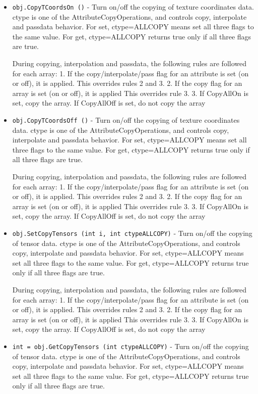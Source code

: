 \begin{itemize}
\item  \verb|obj.CopyTCoordsOn ()| -  Turn on/off the copying of texture coordinates data.
 ctype is one of the AttributeCopyOperations, and controls copy, 
 interpolate and passdata behavior.
 For set, ctype=ALLCOPY means set all three flags to the same value.
 For get, ctype=ALLCOPY returns true only if all three flags are true.

 During copying, interpolation and passdata, the following rules are 
 followed for each array:
 1. If the copy/interpolate/pass flag for an attribute is set (on or off), it is applied.
    This overrides rules 2 and 3.
 2. If the copy flag for an array is set (on or off), it is applied
    This overrides rule 3.
 3. If CopyAllOn is set, copy the array.
    If CopyAllOff is set, do not copy the array

\item  \verb|obj.CopyTCoordsOff ()| -  Turn on/off the copying of texture coordinates data.
 ctype is one of the AttributeCopyOperations, and controls copy, 
 interpolate and passdata behavior.
 For set, ctype=ALLCOPY means set all three flags to the same value.
 For get, ctype=ALLCOPY returns true only if all three flags are true.

 During copying, interpolation and passdata, the following rules are 
 followed for each array:
 1. If the copy/interpolate/pass flag for an attribute is set (on or off), it is applied.
    This overrides rules 2 and 3.
 2. If the copy flag for an array is set (on or off), it is applied
    This overrides rule 3.
 3. If CopyAllOn is set, copy the array.
    If CopyAllOff is set, do not copy the array

\item  \verb|obj.SetCopyTensors (int i, int ctypeALLCOPY)| -  Turn on/off the copying of tensor data.
 ctype is one of the AttributeCopyOperations, and controls copy, 
 interpolate and passdata behavior.
 For set, ctype=ALLCOPY means set all three flags to the same value.
 For get, ctype=ALLCOPY returns true only if all three flags are true.

 During copying, interpolation and passdata, the following rules are 
 followed for each array:
 1. If the copy/interpolate/pass flag for an attribute is set (on or off), it is applied.
    This overrides rules 2 and 3.
 2. If the copy flag for an array is set (on or off), it is applied
    This overrides rule 3.
 3. If CopyAllOn is set, copy the array.
    If CopyAllOff is set, do not copy the array

\item  \verb|int = obj.GetCopyTensors (int ctypeALLCOPY)| -  Turn on/off the copying of tensor data.
 ctype is one of the AttributeCopyOperations, and controls copy, 
 interpolate and passdata behavior.
 For set, ctype=ALLCOPY means set all three flags to the same value.
 For get, ctype=ALLCOPY returns true only if all three flags are true.


\end{itemize}
